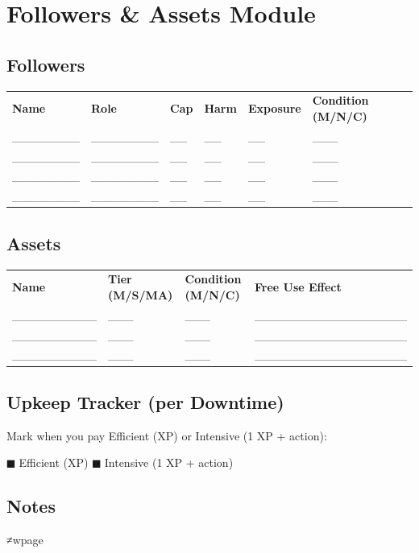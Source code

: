 \documentclass[11pt]{article}
\begin{document}
\section*{Followers & Assets Module}

\subsection*{Followers}
\small
\begin{tabularx}{\textwidth}{p{2.5cm} p{1.8cm} p{1.2cm} p{1.2cm} p{1.5cm} X}
\textbf{Name} & \textbf{Role} & \textbf{Cap} & \textbf{Harm} & \textbf{Exposure} & \textbf{Condition (M/N/C)} \\
________ & ________ & __ & __ & __ & ___ \\
________ & ________ & __ & __ & __ & ___ \\
________ & ________ & __ & __ & __ & ___ \\
________ & ________ & __ & __ & __ & ___ \\
\end{tabularx}
\normalsize

\subsection*{Assets}
\small
\begin{tabularx}{\textwidth}{p{3cm} p{1.5cm} p{1.5cm} X}
\textbf{Name} & \textbf{Tier (M/S/MA)} & \textbf{Condition (M/N/C)} & \textbf{Free Use Effect} \\
__________ & ___ & ___ & __________________ \\
__________ & ___ & ___ & __________________ \\
__________ & ___ & ___ & __________________ \\
\end{tabularx}
\normalsize

\subsection*{Upkeep Tracker (per Downtime)}
Mark when you pay Efficient (XP) or Intensive (1 XP + action):
\begin{center}
$■$ Efficient (XP)  $■$ Intensive (1 XP + action)
\end{center}

\subsection*{Notes}
\vspace{6cm}
≠wpage
\end{document}
